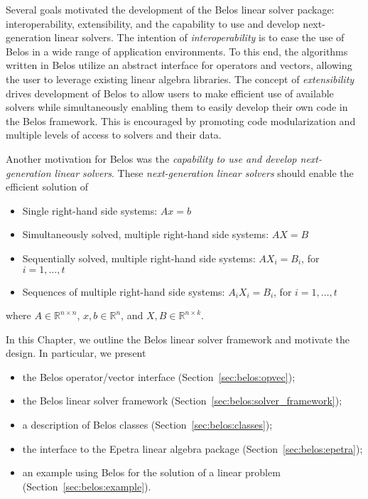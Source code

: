 \begin{introchapter}
Several goals motivated the development of the Belos linear solver package: interoperability,
extensibility, and the capability to use and develop next-generation linear solvers.  The intention 
of \emph{interoperability} is to ease the use of Belos in a wide range of application environments. 
To this end, the algorithms written in Belos utilize an abstract interface for operators and vectors, 
allowing the user to leverage existing linear algebra libraries. The concept of \emph{extensibility} 
drives development of Belos to allow users to make efficient use of available solvers while
simultaneously enabling them to easily develop their own code in the Belos framework.
This is encouraged by promoting code modularization and multiple levels of access to
solvers and their data.

Another motivation for Belos was the \emph{capability to use and develop
next-generation linear solvers}.  These \emph{next-generation linear solvers} should
enable the efficient solution of
\begin{itemize}
  \item Single right-hand side systems: $Ax=b$
  \item Simultaneously solved, multiple right-hand side systems: $AX=B$
  \item Sequentially solved, multiple right-hand side systems: $AX_i = B_i$, for $i=1,\ldots,t$
  \item Sequences of multiple right-hand side systems: $A_iX_i=B_i$, for $i=1,\ldots,t$
\end{itemize}
where $A \in \mathbb{R}^{n \times n}$, $x,b \in \mathbb{R}^n$, and $X,B \in \mathbb{R}^{n \times k}$.

In this Chapter, we outline the Belos linear solver framework and motivate the design.
In particular, we present
\begin{itemize}
  \item the Belos operator/vector interface (Section~\ref{sec:belos:opvec});
  \item the Belos linear solver framework (Section~\ref{sec:belos:solver_framework});
  \item a description of Belos classes (Section~\ref{sec:belos:classes});
  \item the interface to the Epetra linear algebra package (Section~\ref{sec:belos:epetra});
  \item an example using Belos for the solution of a linear problem (Section~\ref{sec:belos:example}).
\end{itemize}
\end{introchapter}

